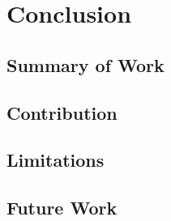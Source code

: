 \chapter{Conclusion}
\label{cha:conclusion}

\section{Summary of Work}

\section{Contribution}

\section{Limitations}

\section{Future Work}
